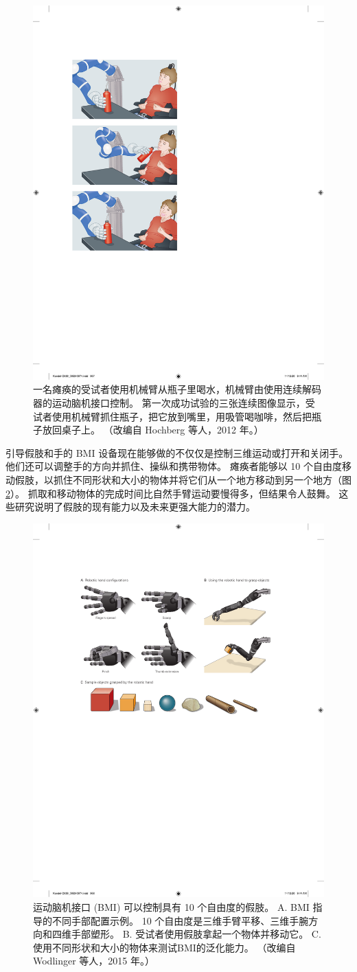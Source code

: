 \begin{figure}[htbp]
	\centering
	\includegraphics[width=0.5\linewidth]{chap39/fig_39_9}
	\caption{一名瘫痪的受试者使用机械臂从瓶子里喝水，机械臂由使用连续解码器的运动脑机接口控制。 
		第一次成功试验的三张连续图像显示，受试者使用机械臂抓住瓶子，把它放到嘴里，用吸管喝咖啡，然后把瓶子放回桌子上。 
		（改编自 Hochberg 等人，2012 年。）}
	\label{fig:39_9}
\end{figure}


引导假肢和手的 BMI 设备现在能够做的不仅仅是控制三维运动或打开和关闭手。
他们还可以调整手的方向并抓住、操纵和携带物体。
瘫痪者能够以 10 个自由度移动假肢，以抓住不同形状和大小的物体并将它们从一个地方移动到另一个地方（图 \ref{fig:39_10}）。
抓取和移动物体的完成时间比自然手臂运动要慢得多，但结果令人鼓舞。
这些研究说明了假肢的现有能力以及未来更强大能力的潜力。


\begin{figure}[htbp]
	\centering
	\includegraphics[width=0.5\linewidth]{chap39/fig_39_10}
	\caption{运动脑机接口 (BMI) 可以控制具有 10 个自由度的假肢。 
		A. BMI 指导的不同手部配置示例。 
		10 个自由度是三维手臂平移、三维手腕方向和四维手部塑形。 
		B. 受试者使用假肢拿起一个物体并移动它。 
		C. 使用不同形状和大小的物体来测试BMI的泛化能力。 
		（改编自 Wodlinger 等人，2015 年。）}
	\label{fig:39_10}
\end{figure}


